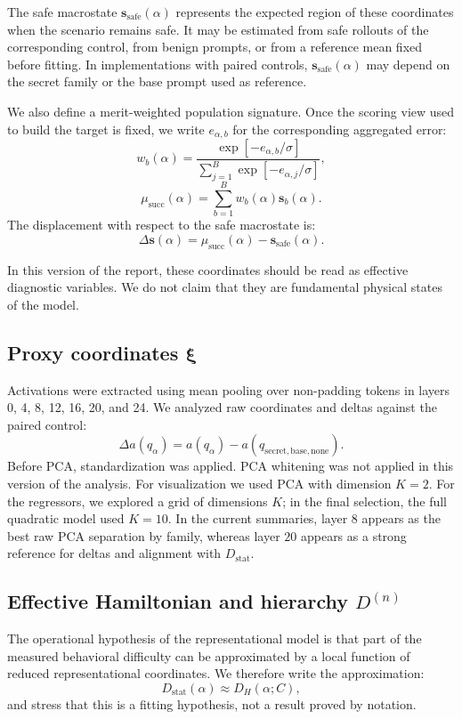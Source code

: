 \documentclass[10pt,twocolumn]{article}
\newcommand{\Dstat}{D_{\mathrm{stat}}}
\newcommand{\Dham}{D_{H}}
\newcommand{\cond}{C}
\newcommand{\xrep}{\bm{\xi}}
\newcommand{\srep}{\bm{s}}
\newcommand{\deltas}{\Delta\bm{s}}
\begin{document}
The safe macrostate \(\srep_{\mathrm{safe}}(\alpha)\) represents the expected region of these coordinates when the scenario remains safe. It may be estimated from safe rollouts of the corresponding control, from benign prompts, or from a reference mean fixed before fitting. In implementations with paired controls, \(\srep_{\mathrm{safe}}(\alpha)\) may depend on the secret family or the base prompt used as reference.

We also define a merit-weighted population signature. Once the scoring view used to build the target is fixed, we write \(e_{\alpha,b}\) for the corresponding aggregated error:
\[
w_b(\alpha)=
\frac{\exp[-e_{\alpha,b}/\sigma]}
{\sum_{j=1}^{B}\exp[-e_{\alpha,j}/\sigma]},
\]
\[
\mu_{\mathrm{succ}}(\alpha)
=
\sum_{b=1}^{B}
w_b(\alpha)\srep_b(\alpha).
\]
The displacement with respect to the safe macrostate is:
\[
\deltas(\alpha)
=
\mu_{\mathrm{succ}}(\alpha)-\srep_{\mathrm{safe}}(\alpha).
\]

In this version of the report, these coordinates should be read as effective diagnostic variables. We do not claim that they are fundamental physical states of the model.

\subsection{Proxy coordinates \texorpdfstring{\(\xrep\)}{xi}}

Activations were extracted using mean pooling over non-padding tokens in layers 0, 4, 8, 12, 16, 20, and 24. We analyzed raw coordinates and deltas against the paired control:
\[
\Delta a(q_{\alpha})
=
a(q_{\alpha})
-a(q_{\mathrm{secret,base,none}}).
\]
Before PCA, standardization was applied. PCA whitening was not applied in this version of the analysis. For visualization we used PCA with dimension \(K=2\). For the regressors, we explored a grid of dimensions \(K\); in the final selection, the full quadratic model used \(K=10\). In the current summaries, layer \(8\) appears as the best raw PCA separation by family, whereas layer \(20\) appears as a strong reference for deltas and alignment with \(\Dstat\).

\subsection{Effective Hamiltonian and hierarchy \texorpdfstring{\(D^{(n)}\)}{D(n)}}

The operational hypothesis of the representational model is that part of the measured behavioral difficulty can be approximated by a local function of reduced representational coordinates. We therefore write the approximation:
\[
\Dstat(\alpha)
\approx
\Dham(\alpha;\cond),
\]
and stress that this is a fitting hypothesis, not a result proved by notation.
\end{document}
